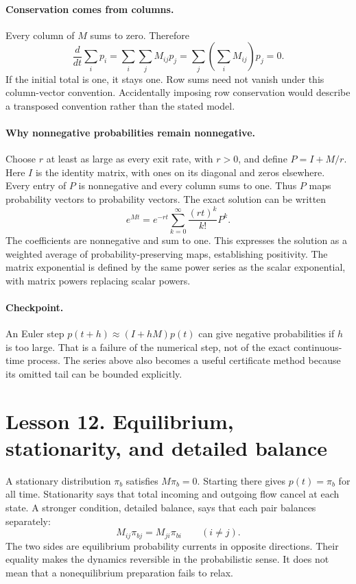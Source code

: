 \paragraph{Conservation comes from columns.}
Every column of $M$ sums to zero. Therefore
\[
\frac{d}{dt}\sum_i p_i
=\sum_i\sum_jM_{ij}p_j
=\sum_j\left(\sum_iM_{ij}\right)p_j=0.
\]
If the initial total is one, it stays one. Row sums need not vanish under
this column-vector convention. Accidentally imposing row conservation
would describe a transposed convention rather than the stated model.

\paragraph{Why nonnegative probabilities remain nonnegative.}
Choose $r$ at least as large as every exit rate, with $r>0$, and define
$P=I+M/r$. Here $I$ is the identity matrix, with ones on its diagonal and
zeros elsewhere. Every entry of $P$ is nonnegative and every column sums
to one. Thus $P$ maps probability vectors to probability vectors. The exact
solution can be written
\[
e^{Mt}=e^{-rt}\sum_{k=0}^{\infty}\frac{(rt)^k}{k!}P^k.
\]
The coefficients are nonnegative and sum to one. This expresses the solution
as a weighted average of probability-preserving maps, establishing positivity.
The matrix exponential is defined by the same power series as the scalar
exponential, with matrix powers replacing scalar powers.

\paragraph{Checkpoint.}
An Euler step $p(t+h)\approx(I+hM)p(t)$ can give negative probabilities if
$h$ is too large. That is a failure of the numerical step, not of the exact
continuous-time process. The series above also becomes a useful certificate
method because its omitted tail can be bounded explicitly.

\clearpage
\section*{Lesson 12. Equilibrium, stationarity, and detailed balance}
A stationary distribution $\pi_b$ satisfies $M\pi_b=0$. Starting there gives
$p(t)=\pi_b$ for all time. Stationarity says that total incoming and outgoing
flow cancel at each state. A stronger condition, detailed balance, says that
each pair balances separately:
\[
M_{ij}\pi_{bj}=M_{ji}\pi_{bi}\qquad(i\ne j).
\]
The two sides are equilibrium probability currents in opposite directions.
Their equality makes the dynamics reversible in the probabilistic sense.
It does not mean that a nonequilibrium preparation fails to relax.

